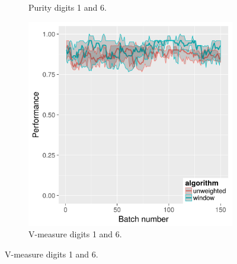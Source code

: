 \begin{figure}[H]
\begin{subfigure}{.3\textwidth}
  \caption{Purity digits 1 and 6.}
\end{subfigure}
\begin{subfigure}{.3\textwidth}
  \centering
  \includegraphics[width=\linewidth]{pendigits_2_alg/uci_pendigits_16_ci_one_size_vmeasure.png}
  \caption{V-measure digits 1 and 6.}
\end{subfigure}


\end{figure}
